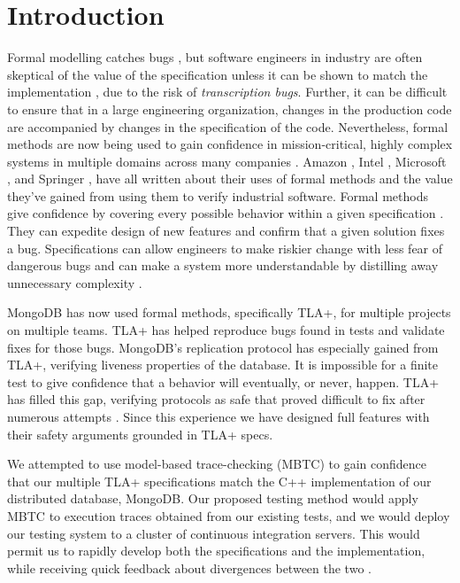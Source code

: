 \documentclass{vldb}
\begin{document}
\section{Introduction}

Formal modelling catches bugs \cite{Newcombe2014UseOfFormalMethodsAmazon}, but software engineers in industry are often skeptical of the value of the specification unless it can be shown to match the implementation \cite{Wayne18AgileFormalMethods, Newcombe2014UseOfFormalMethodsAmazon}, due to the risk of \textit{transcription bugs}. 
Further, it can be difficult to ensure that in a large engineering organization, changes in the production code are accompanied by changes in the specification of the code.
Nevertheless, formal methods are now being used to gain confidence in mission-critical, highly complex systems in multiple domains across many companies \cite{Tasiran03AlphaMicroprocessor}. 
Amazon \cite{Newcombe2014UseOfFormalMethodsAmazon, Chudnov18AmazonS2N, Cook18SecurityAWS}, Intel \cite{Kaivola09IntelI7, Beers08IntelExperience}, Microsoft \cite{Shukla18AzureCosmosDB}, and Springer \cite{Neubauer12AutomatedContinuousQualityAssurance}, have all written about their uses of formal methods and the value they've gained from using them to verify industrial software. 
Formal methods give confidence by covering every possible behavior within a given specification \cite{Kaivola09IntelI7}. 
They can expedite design of new features and confirm that a given solution fixes a bug. 
Specifications can allow engineers to make riskier change with less fear of dangerous bugs and can make a system more understandable by distilling away unnecessary complexity  \cite{Newcombe2014UseOfFormalMethodsAmazon}.

MongoDB has now used formal methods, specifically TLA+, for multiple projects on multiple teams. 
TLA+ has helped reproduce bugs found in tests and validate fixes for those bugs. 
MongoDB's replication protocol has especially gained from TLA+, verifying liveness properties of the database. 
It is impossible for a finite test to give confidence that a behavior will eventually, or never, happen. TLA+ has filled this gap, verifying protocols as safe that proved difficult to fix after numerous attempts \cite{Schultz19BugsLife}. 
Since this experience we have designed full features with their safety arguments grounded in TLA+ specs. 

We attempted to use model-based trace-checking (MBTC) \cite{MBTC} to gain confidence that our multiple TLA+ specifications match the C++ implementation of our distributed database, MongoDB.
Our proposed testing method would apply MBTC to execution traces obtained from our existing tests, and we would deploy our testing system to a cluster of continuous integration servers.
This would permit us to rapidly develop both the specifications and the implementation, while receiving quick feedback about divergences between the two \cite{Gravell11ConcurrentDevelopmentOfModelAndImplementation}.
\end{document}
